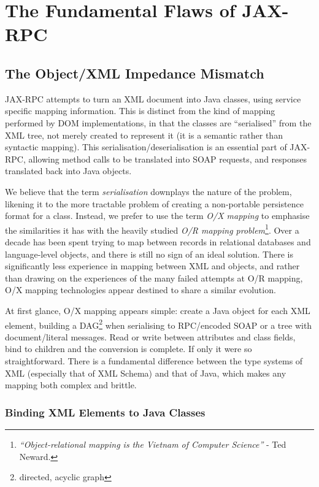 \section{The Fundamental Flaws of JAX-RPC}
\label{objections}

\subsection{The Object/XML Impedance Mismatch}
\label{objections:o-x}

JAX-RPC attempts to turn an XML document into Java classes, using
service specific mapping information. This is distinct from the kind
of mapping performed by DOM implementations, in that the classes are
``serialised'' from the XML tree, not merely created to represent it
(it is a semantic rather than syntactic mapping). This
serialisation/deserialisation is an essential part of JAX-RPC,
allowing method calls to be translated into SOAP requests, and
responses translated back into Java objects.

We believe that the term \emph{serialisation} downplays the nature of
the problem, likening it to the more tractable problem of creating a
non-portable persistence format for a class. Instead, we prefer to use
the term \emph{O/X mapping} to emphasise the similarities it has with
the heavily studied \emph{O/R mapping problem}\footnote{
\emph{``Object-relational mapping is the Vietnam of Computer Science''}
- Ted Neward.
}. 
Over a decade has been spent trying to map between records in relational
databases and language-level objects, and there is still no sign of an ideal
solution. There is significantly less experience in mapping between XML and
objects, and rather than drawing on the experiences of the many failed attempts
at O/R mapping, O/X mapping technologies appear destined to share a similar
evolution.

At first glance, O/X mapping appears simple: create a Java object for
each XML element, building a DAG\footnote{directed, acyclic graph}
when serialising to RPC/encoded SOAP or a tree with document/literal
messages. Read or write between attributes and class fields, bind to
children and the conversion is complete. If only it were so
straightforward. There is a fundamental difference between the type
systems of XML (especially that of XML Schema) and that of Java, which
makes any mapping both complex and brittle.

\subsubsection{Binding XML Elements to Java Classes}
\label{objections:o-x:xml-classes}

